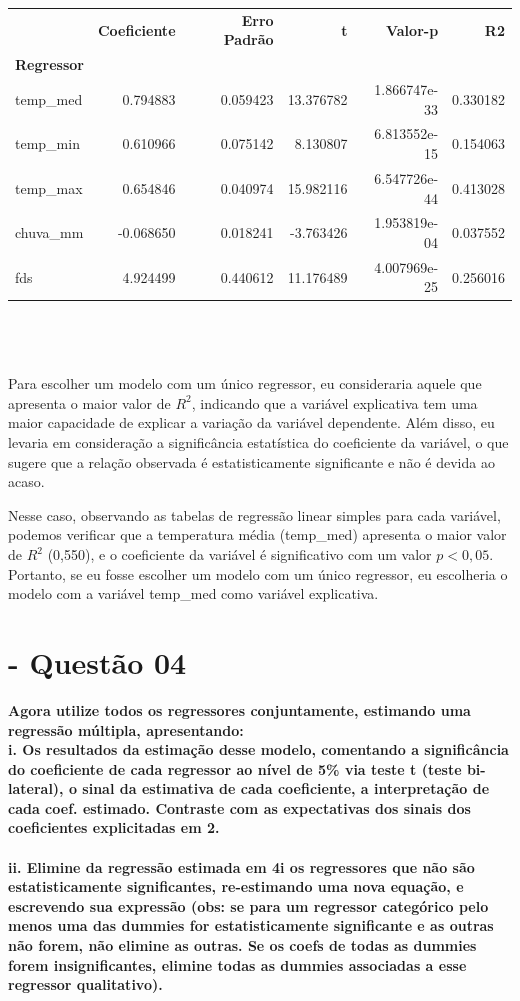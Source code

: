 \documentclass[a4paper, 12pt]{article}
\begin{document}
\begin{tabular}{lrrrrr}
\toprule
{} &  \textbf{Coeficiente} &  \textbf{Erro Padrão} &          \textbf{t} &       \textbf{Valor-p} &        \textbf{R2} \\
\textbf{Regressor} &              &              &            &               &           \\
\midrule
temp\_med  &     0.794883 &     0.059423 &  13.376782 &  1.866747e-33 &  0.330182 \\
temp\_min  &     0.610966 &     0.075142 &   8.130807 &  6.813552e-15 &  0.154063 \\
temp\_max  &     0.654846 &     0.040974 &  15.982116 &  6.547726e-44 &  0.413028 \\
chuva\_mm  &    -0.068650 &     0.018241 &  -3.763426 &  1.953819e-04 &  0.037552 \\
fds       &     4.924499 &     0.440612 &  11.176489 &  4.007969e-25 &  0.256016 \\
\bottomrule
\end{tabular} \\ \\ \\

Para escolher um modelo com um único regressor, eu consideraria aquele que apresenta o maior valor de $R^2$, indicando que a variável explicativa tem uma maior capacidade de explicar a variação da variável dependente. Além disso, eu levaria em consideração a significância estatística do coeficiente da variável, o que sugere que a relação observada é estatisticamente significante e não é devida ao acaso.

Nesse caso, observando as tabelas de regressão linear simples para cada variável, podemos verificar que a temperatura média (temp\_med) apresenta o maior valor de $R^2$ (0,550), e o coeficiente da variável é significativo com um valor $p < 0,05$. Portanto, se eu fosse escolher um modelo com um único regressor, eu escolheria o modelo com a variável temp\_med como variável explicativa.


\section{- Questão 04}
\textbf{Agora utilize todos os regressores conjuntamente, estimando uma regressão múltipla, apresentando:}\\

\textbf{i. Os resultados da estimação desse modelo, comentando a significância do coeficiente de
cada regressor ao nível de 5\% via teste t (teste bi-lateral), o sinal da estimativa de cada coeficiente, a interpretação de cada coef. estimado. Contraste com as expectativas dos sinais
dos coeficientes explicitadas em 2.} \\ \\
\textbf{ii. Elimine da regressão estimada em 4i os regressores que não são estatisticamente significantes, re-estimando uma nova equação, e escrevendo sua expressão (obs: se para um regressor categórico pelo menos uma das dummies for estatisticamente significante e as outras não forem, não elimine as outras. Se os coefs de todas as dummies forem insignificantes, elimine todas as dummies associadas a esse regressor qualitativo).}
\end{document}
